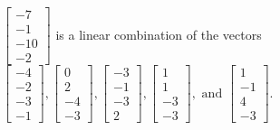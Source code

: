 \begin{exercise}
\begin{exerciseStatement}
  \end{exerciseStatement}
  \begin{exerciseAnswer}
   \(\left[\begin{array}{c}
-7 \\
-1 \\
-10 \\
-2
\end{array}\right]\) 
  	 is  
	a linear combination of the vectors \(\left[\begin{array}{c}
-4 \\
-2 \\
-3 \\
-1
\end{array}\right] , \left[\begin{array}{c}
0 \\
2 \\
-4 \\
-3
\end{array}\right] , \left[\begin{array}{c}
-3 \\
-1 \\
-3 \\
2
\end{array}\right] , \left[\begin{array}{c}
1 \\
1 \\
-3 \\
-3
\end{array}\right] , \text{ and } \left[\begin{array}{c}
1 \\
-1 \\
4 \\
-3
\end{array}\right]\).

	
  


  \end{exerciseAnswer}
\end{exercise}